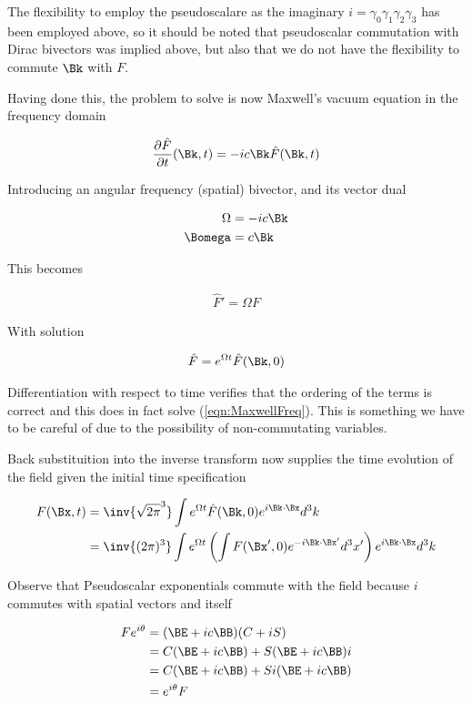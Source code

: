 \documentclass[]{eliblog}
\begin{document}
The flexibility to employ the pseudoscalare as the imaginary $i = \gamma_0 \gamma_1 \gamma_2 \gamma_3$ has been employed above, so it should
be noted that pseudoscalar commutation with Dirac bivectors was implied above, but also that we do not have the flexibility to commute $\Bk$ with $F$.

Having done this, the problem to solve is now Maxwell's vacuum equation in the frequency domain

\begin{align*}
\PD{t}{\hat{F}}(\Bk,t) = -i c \Bk \hat{F}(\Bk,t)
\end{align*}

Introducing an angular frequency (spatial) bivector, and its vector dual

\begin{align}
\Omega &= -i c \Bk \\
\Bomega &= c \Bk
\end{align}

This becomes

\begin{align}\label{eqn:MaxwellFreq}
\hat{F}' = \Omega F
\end{align}

With solution

\begin{align}
\hat{F} = e^{\Omega t} \hat{F}(\Bk,0)
\end{align}

Differentiation with respect to time verifies that the ordering of the terms is correct and this does in fact solve (\ref{eqn:MaxwellFreq}).  This
is something we have to be careful of due to the possibility of non-commutating variables.

Back substituition into the inverse transform now supplies the time evolution of the field given the initial time specification

\begin{align*}
F(\Bx,t)
&= \inv{\sqrt{2\pi}^3} \int e^{\Omega t} \hat{F}(\Bk,0) e^{i \Bk \cdot \Bx} d^3 k \\
&= \inv{(2\pi)^3} \int e^{\Omega t} \left( \int {F}(\Bx',0) e^{-i \Bk \cdot \Bx'} d^3 x' \right) e^{i \Bk \cdot \Bx} d^3 k
\end{align*}

Observe that Pseudoscalar exponentials commute with the field because $i$ commutes with spatial vectors and itself

\begin{align*}
F e^{i\theta}
&= (\BE + i c \BB) (C + iS) \\
&=
C (\BE + i c \BB)
+ S (\BE + i c \BB) i  \\
&=
C (\BE + i c \BB)
+ S i (\BE + i c \BB) \\
&=
e^{i\theta} F
\end{align*}
\end{document}

